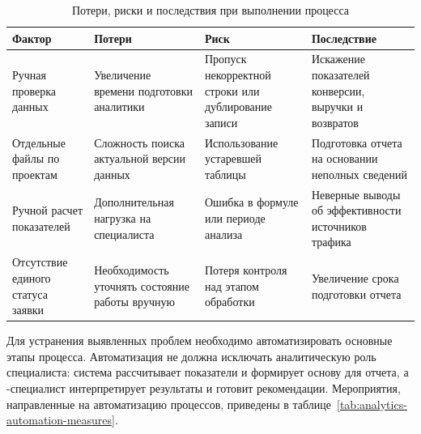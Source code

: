 \begin{table}[H]
    \caption{Потери, риски и последствия при выполнении процесса}
    \label{tab:analytics-risks}
    {\small
    \setlength{\tabcolsep}{4pt}
    \begin{tabularx}{\textwidth}{|P{0.24\textwidth}|L|L|L|}
        \hline
        Фактор & Потери & Риск & Последствие \\
        \hline
        Ручная проверка данных & Увеличение времени подготовки аналитики & Пропуск некорректной строки или дублирование записи & Искажение показателей конверсии, выручки и возвратов \\
        \hline
        Отдельные файлы по проектам & Сложность поиска актуальной версии данных & Использование устаревшей таблицы & Подготовка отчета на основании неполных сведений \\
        \hline
        Ручной расчет показателей & Дополнительная нагрузка на специалиста & Ошибка в формуле или периоде анализа & Неверные выводы об эффективности источников трафика \\
        \hline
        Отсутствие единого статуса заявки & Необходимость уточнять состояние работы вручную & Потеря контроля над этапом обработки & Увеличение срока подготовки отчета \\
        \hline
    \end{tabularx}
    }
\end{table}

Для устранения выявленных проблем необходимо автоматизировать основные этапы процесса. Автоматизация не должна исключать аналитическую роль специалиста: система рассчитывает показатели и формирует основу для отчета, а -специалист интерпретирует результаты и готовит рекомендации. Мероприятия, направленные на автоматизацию процессов, приведены в таблице~\ref{tab:analytics-automation-measures}.

